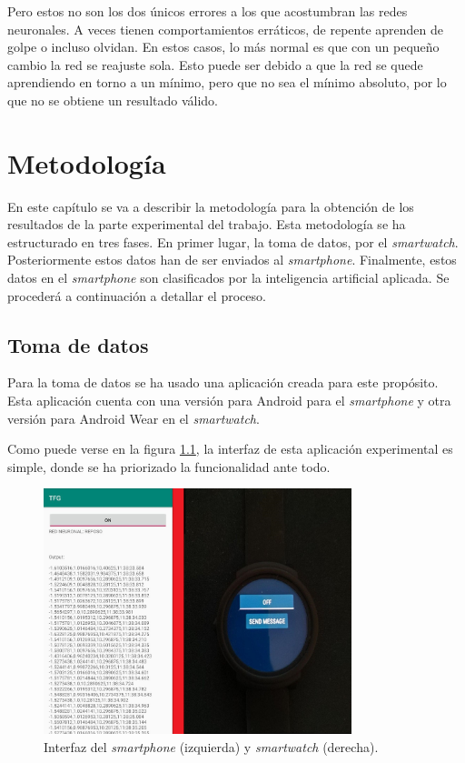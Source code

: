 \documentclass[12pt]{book}
\numberwithin{equation}{section}
\begin{document}
Pero estos no son los dos únicos errores a los que acostumbran las redes neuronales. A veces tienen comportamientos erráticos, de repente aprenden de golpe o incluso olvidan. En estos casos, lo más normal es que con un pequeño cambio la red se reajuste sola. Esto puede ser debido a que la red se quede aprendiendo en torno a un mínimo, pero que no sea el mínimo absoluto, por lo que no se obtiene un resultado válido.


\chapter{Metodología}
En este capítulo se va a describir la metodología para la obtención de los resultados de la parte experimental del trabajo. Esta metodología se ha estructurado en tres fases. En primer lugar, la toma de datos, por el \textit{smartwatch}. Posteriormente estos datos han de ser enviados al \textit{smartphone}. Finalmente, estos datos en el \textit{smartphone} son clasificados por la inteligencia artificial aplicada. Se procederá a continuación a detallar el proceso.

\section{Toma de datos}

Para la toma de datos se ha usado una aplicación creada para este propósito. Esta aplicación cuenta con una versión para Android para el \textit{smartphone} y otra versión para Android Wear en el \textit{smartwatch}.

Como puede verse en la figura \ref{fig:mesh2}, la interfaz de esta aplicación experimental es simple, donde se ha priorizado la funcionalidad ante todo.

\begin{figure}[h]
    \centering
    \includegraphics[width=0.8\textwidth]{Interfaces.jpg}
    \caption{Interfaz del \textit{smartphone} (izquierda) y \textit{smartwatch} (derecha).}
    \label{fig:mesh2}
\end{figure}
\end{document}
